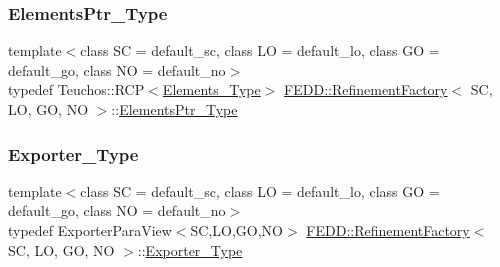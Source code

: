\mbox{\label{classFEDD_1_1RefinementFactory_a0994b5b7b6d080048673941251999f2e}} 
\subsubsection{\texorpdfstring{Elements\+Ptr\+\_\+\+Type}{ElementsPtr\_Type}}
{\footnotesize\ttfamily template$<$class SC  = default\+\_\+sc, class LO  = default\+\_\+lo, class GO  = default\+\_\+go, class NO  = default\+\_\+no$>$ \\
typedef Teuchos\+::\+R\+CP$<$\hyperlink{classFEDD_1_1RefinementFactory_a0879b04ac1b1830fae7d6a7e29d36000}{Elements\+\_\+\+Type}$>$ \hyperlink{classFEDD_1_1RefinementFactory}{F\+E\+D\+D\+::\+Refinement\+Factory}$<$ SC, LO, GO, NO $>$\+::\hyperlink{classFEDD_1_1RefinementFactory_a0994b5b7b6d080048673941251999f2e}{Elements\+Ptr\+\_\+\+Type}}

\mbox{\label{classFEDD_1_1RefinementFactory_a268cb28ca6c68a4c32a912068c643933}} 
\subsubsection{\texorpdfstring{Exporter\+\_\+\+Type}{Exporter\_Type}}
{\footnotesize\ttfamily template$<$class SC  = default\+\_\+sc, class LO  = default\+\_\+lo, class GO  = default\+\_\+go, class NO  = default\+\_\+no$>$ \\
typedef Exporter\+Para\+View$<$SC,LO,GO,NO$>$ \hyperlink{classFEDD_1_1RefinementFactory}{F\+E\+D\+D\+::\+Refinement\+Factory}$<$ SC, LO, GO, NO $>$\+::\hyperlink{classFEDD_1_1RefinementFactory_a268cb28ca6c68a4c32a912068c643933}{Exporter\+\_\+\+Type}}

\mbox{\label{classFEDD_1_1RefinementFactory_ae74a8143ddf273f2a13df4055233759c}} 
